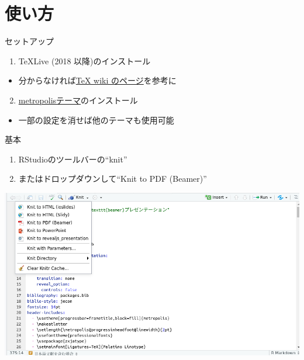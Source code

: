 \documentclass[
  12pt,
  ignorenonframetext,
]{beamer}
\providecommand{\tightlist}{%
  \setlength{\itemsep}{0pt}\setlength{\parskip}{0pt}}
\begin{document}
\hypertarget{ux4f7fux3044ux65b9}{%
\section{使い方}\label{ux4f7fux3044ux65b9}}

\begin{frame}{セットアップ}
\protect\hypertarget{ux30bbux30c3ux30c8ux30a2ux30c3ux30d7}{}

\begin{enumerate}
\tightlist
\item
  TeXLive (2018 以降)のインストール
\end{enumerate}

\begin{itemize}
\tightlist
\item
  分からなければ\href{https://texwiki.texjp.org/?TeX\%20Live}{TeX wiki
  のページ}を参考に
\end{itemize}

\begin{enumerate}
\setcounter{enumi}{1}
\tightlist
\item
  \href{https://github.com/matze/mtheme}{metropolisテーマ}のインストール
\end{enumerate}

\begin{itemize}
\tightlist
\item
  一部の設定を消せば他のテーマも使用可能
\end{itemize}

\end{frame}

\begin{frame}{基本}
\protect\hypertarget{ux57faux672c}{}

\begin{enumerate}
\tightlist
\item
  RStudioのツールバーの``knit''
\item
  またはドロップダウンして``Knit to PDF (Beamer)''
\end{enumerate}

\begin{center}\includegraphics[width=0.9\linewidth]{img/render} \end{center}

\end{frame}
\end{document}
